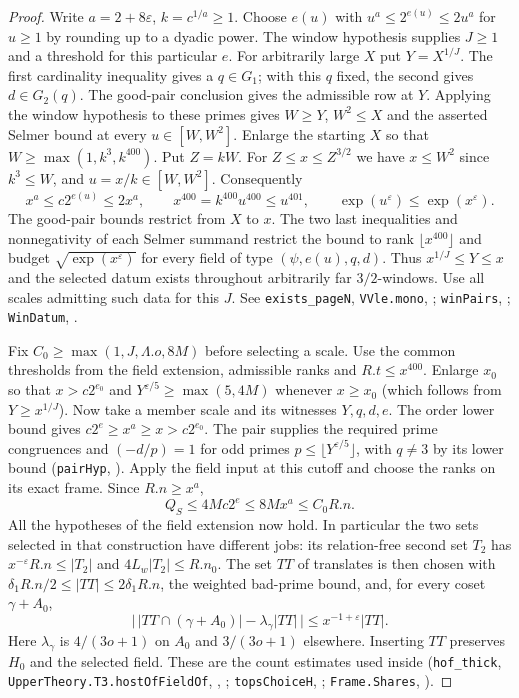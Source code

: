 \begin{proof}
Write $a=2+8\varepsilon$, $k=c^{1/a}\ge1$. Choose $e(u)$ with
$u^a\le2^{e(u)}\le2u^a$ for $u\ge1$ by rounding up to a dyadic power.
The window hypothesis supplies $J\ge1$ and a threshold for this
particular $e$. For arbitrarily large $X$ put $Y=X^{1/J}$.
The first cardinality inequality gives a $q\in G_1$; with this $q$
fixed, the second gives $d\in G_2(q)$. The good-pair conclusion
gives the admissible row at $Y$. Applying the window hypothesis to
these primes gives $W\ge Y$, $W^2\le X$ and the asserted Selmer
bound at every $u\in[W,W^2]$. Enlarge the starting $X$ so that
$W\ge\max(1,k^3,k^{400})$. Put $Z=kW$. For $Z\le x\le Z^{3/2}$
we have $x\le W^2$ since $k^3\le W$, and $u=x/k\in[W,W^2]$.
Consequently
\[
 x^a\le c2^{e(u)}\le2x^a,\qquad
 x^{400}=k^{400}u^{400}\le u^{401},\qquad
 \exp(u^\varepsilon)\le\exp(x^\varepsilon).
\]
The good-pair bounds restrict from $X$ to $x$.
The two last inequalities and nonnegativity of each Selmer summand
restrict the bound to rank $\lfloor x^{400}\rfloor$ and budget
$\sqrt{\exp(x^\varepsilon)}$ for every field of type
$(\psi,e(u),q,d)$. Thus $x^{1/J}\le Y\le x$ and
the selected datum exists throughout arbitrarily far $3/2$-windows.
Use all scales admitting such data for this $J$.
See \nolinkurl{exists_pageN}, \nolinkurl{VVle.mono},
;
\nolinkurl{winPairs}, ;
\nolinkurl{WinDatum}, .

Fix $C_0\ge\max(1,J,\Lambda.o,8M)$ before selecting a scale. Use the
common thresholds from the field extension, admissible ranks and
$R.t\le x^{400}$. Enlarge $x_0$ so that $x>c2^{e_0}$ and
$Y^{\varepsilon/5}\ge\max(5,4M)$ whenever $x\ge x_0$
(which follows from $Y\ge x^{1/J}$). Now take a member scale
and its witnesses $Y,q,d,e$. The order lower bound gives
$c2^e\ge x^a\ge x>c2^{e_0}$. The pair supplies the required prime
congruences and $(-d/p)=1$ for odd primes $p\le\lfloor
Y^{\varepsilon/5}\rfloor$, with $q\ne3$ by its lower bound (\nolinkurl{pairHyp}, ).
Apply the field input at this cutoff and choose the ranks on its exact
frame. Since $R.n\ge x^a$,
\[
 Q_S\le4Mc2^e\le8Mx^a\le C_0R.n .
\]
All the hypotheses of the field extension now hold. In particular the
two sets selected in that construction have different jobs: its
relation-free second set $T_2$ has
$x^{-\varepsilon}R.n\le |T_2|$ and $4L_w|T_2|\le R.n_0$.
The set $TT$ of translates is then chosen with
$\delta_1R.n/2\le |TT|\le2\delta_1R.n$, the weighted bad-prime bound,
and, for every coset $\gamma+A_0$,
\[
  \big|\,|TT\cap(\gamma+A_0)|-\lambda_\gamma |TT|\,\big|
   \le x^{-1+\varepsilon}|TT|.
\]
Here $\lambda_\gamma$ is $4/(3o+1)$ on $A_0$ and $3/(3o+1)$ elsewhere.
Inserting $TT$ preserves $H_0$ and the selected field. These are the
count estimates used inside 
(\nolinkurl{hof_thick}, \nolinkurl{UpperTheory.T3.hostOfFieldOf},
, ;
\nolinkurl{topsChoiceH}, ;
\nolinkurl{Frame.Shares}, ).


\end{proof}
